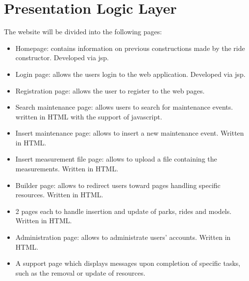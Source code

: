 \section{Presentation Logic Layer}

The website will be divided into the following pages:
\begin{itemize}
    \item Homepage: contains information on previous constructions made by the ride constructor. Developed via jsp.
    \item Login page: allows the users login to the web application. Developed via jsp.
    \item Registration page: allows the user to register to the web pages.
    \item Search maintenance page: allows users to search for maintenance events. written in HTML with the support of javascript.
    \item Insert maintenance page: allows to insert a new maintenance event. Written in HTML.
    \item Insert measurement file page: allows to upload a file containing the measurements. Written in HTML.
    \item  Builder page: allows to redirect users toward pages handling specific resources. Written in HTML.
    \item 2 pages each to handle insertion and update of parks, rides and models. Written in HTML.
    \item Administration page: allows to administrate users’ accounts. Written in HTML.
    \item A support page which displays messages upon completion of specific tasks, such as the removal or update of resources.
\end{itemize}






